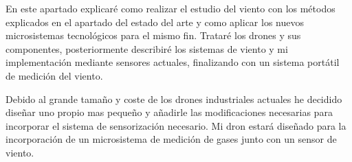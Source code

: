
En este apartado explicaré como realizar el estudio del viento con los métodos explicados en el apartado del estado del arte y como aplicar los nuevos microsistemas tecnológicos para el mismo fin. Trataré los drones y sus componentes, posteriormente describiré los sistemas de viento y mi implementación mediante sensores actuales, finalizando con un sistema portátil de medición del viento.

Debido al grande tamaño y coste de los drones industriales actuales he decidido diseñar uno propio mas pequeño y añadirle las modificaciones necesarias para incorporar el sistema de sensorización necesario. Mi dron estará diseñado para la incorporación de un microsistema de medición de gases junto con un sensor de viento. 



